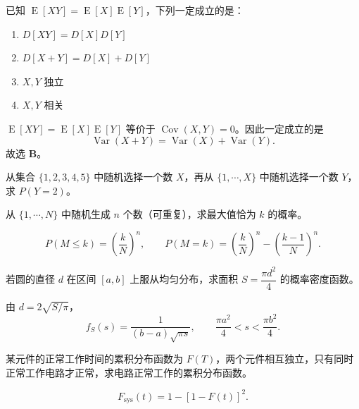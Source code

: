 ﻿

\begin{question}
已知 $\operatorname{E}[XY]=\operatorname{E}[X]\operatorname{E}[Y]$，下列一定成立的是：
\begin{enumerate}[label=\alph*.,leftmargin=2.2em,itemsep=0.2em]
\item $D[XY]=D[X]D[Y]$
\item $D[X+Y]=D[X]+D[Y]$
\item $X,Y$ 独立
\item $X,Y$ 相关
\end{enumerate}
\begin{solution}
$\operatorname{E}[XY]=\operatorname{E}[X]\operatorname{E}[Y]$ 等价于 $\operatorname{Cov}(X,Y)=0$。因此一定成立的是
\[
\operatorname{Var}(X+Y)=\operatorname{Var}(X)+\operatorname{Var}(Y).
\]
故选 \textbf{B}。
\end{solution}
\end{question}

\begin{question}
从集合 $\{1,2,3,4,5\}$ 中随机选择一个数 $X$，再从 $\{1,\cdots,X\}$ 中随机选择一个数 $Y$，求 $P(Y=2)$。
\begin{solution}
\end{solution}
\end{question}

\begin{question}
从 $\{1,\cdots,N\}$ 中随机生成 $n$ 个数（可重复），求最大值恰为 $k$ 的概率。
\begin{solution}
\[
P(M\le k)=\left(\frac{k}{N}\right)^n,
\qquad
P(M=k)=\left(\frac{k}{N}\right)^n-\left(\frac{k-1}{N}\right)^n.
\]
\end{solution}
\end{question}

\begin{question}
若圆的直径 $d$ 在区间 $[a,b]$ 上服从均匀分布，求面积 $S=\dfrac{\pi d^2}{4}$ 的概率密度函数。
\begin{solution}
由 $d=2\sqrt{S/\pi}$，
\[
f_S(s)=\frac{1}{(b-a)\sqrt{\pi s}},
\qquad \frac{\pi a^2}{4}<s<\frac{\pi b^2}{4}.
\]
\end{solution}
\end{question}

\begin{question}
某元件的正常工作时间的累积分布函数为 $F(T)$，两个元件相互独立，只有同时正常工作电路才正常，求电路正常工作的累积分布函数。
\begin{solution}
\[
F_{\text{sys}}(t)=1-[1-F(t)]^2.
\]
\end{solution}
\end{question}

